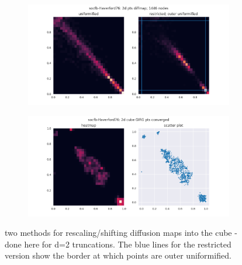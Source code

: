 \begin{figure}
  \begin{subfigure}{\textwidth}
    \centering
    \includegraphics[width=\linewidth]{figures/socfb-Haverford76_2ddiffmap_unif_vs_restrict.png}
  \end{subfigure}

  \vspace{1em}
  \begin{subfigure}{\textwidth}
    \centering
    \includegraphics[width=\linewidth]{figures/socfb-Haverford76_2d_cube_GIRG_converged.png}
  \end{subfigure}


  \caption{two methods for rescaling/shifting diffusion maps into the cube - done here for d=2 truncations. The blue lines for the restricted version show the border at which points are outer uniformified.}
  \label{fig:uniformifed_vs_restricted_rescaling}
\end{figure}


